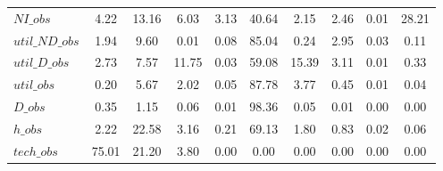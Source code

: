 \begin{center}
\begin{longtable}{lccccccccc}
$NI\_obs        $	 & 	         4.22	 & 	        13.16	 & 	         6.03	 & 	         3.13	 & 	        40.64	 & 	         2.15	 & 	         2.46	 & 	         0.01	 & 	        28.21 \\ 
$util\_ND\_obs  $	 & 	         1.94	 & 	         9.60	 & 	         0.01	 & 	         0.08	 & 	        85.04	 & 	         0.24	 & 	         2.95	 & 	         0.03	 & 	         0.11 \\ 
$util\_D\_obs   $	 & 	         2.73	 & 	         7.57	 & 	        11.75	 & 	         0.03	 & 	        59.08	 & 	        15.39	 & 	         3.11	 & 	         0.01	 & 	         0.33 \\ 
$util\_obs      $	 & 	         0.20	 & 	         5.67	 & 	         2.02	 & 	         0.05	 & 	        87.78	 & 	         3.77	 & 	         0.45	 & 	         0.01	 & 	         0.04 \\ 
$D\_obs         $	 & 	         0.35	 & 	         1.15	 & 	         0.06	 & 	         0.01	 & 	        98.36	 & 	         0.05	 & 	         0.01	 & 	         0.00	 & 	         0.00 \\ 
$h\_obs         $	 & 	         2.22	 & 	        22.58	 & 	         3.16	 & 	         0.21	 & 	        69.13	 & 	         1.80	 & 	         0.83	 & 	         0.02	 & 	         0.06 \\ 
$tech\_obs      $	 & 	        75.01	 & 	        21.20	 & 	         3.80	 & 	         0.00	 & 	         0.00	 & 	         0.00	 & 	         0.00	 & 	         0.00	 & 	         0.00 \\ 
\end{longtable}
 \end{center}
